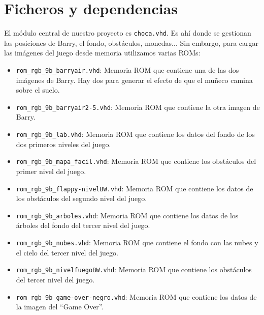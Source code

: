 \documentclass[11pt, a4paper, spanish, openright, twoside]{book}
\begin{document}
\newpage
\mbox{}
\thispagestyle{empty}						%
\newpage


\tableofcontents 							%

\newpage
\mbox{}
\thispagestyle{empty}						%
\newpage


\vspace{3cm}


\section{Ficheros y dependencias}
El módulo central de nuestro proyecto es \texttt{choca.vhd}. Es ahí donde se gestionan las posiciones de Barry, el fondo, obstáculos, monedas... Sin embargo, para cargar las imágenes del juego desde memoria utilizamos varias ROMs:

\begin{itemize}

	\item \texttt{rom\_rgb\_9b\_barryair.vhd}: Memoria ROM que contiene una de las dos imágenes de Barry.	Hay dos para generar el efecto de que el muñeco camina sobre el suelo.
	\item \texttt{rom\_rgb\_9b\_barryair2-5.vhd}: Memoria ROM que contiene la otra imagen de Barry.
	\item \texttt{rom\_rgb\_9b\_lab.vhd}: Memoria ROM que contiene los datos del fondo de los dos primeros niveles del juego.
	\item \texttt{rom\_rgb\_9b\_mapa\_facil.vhd}: Memoria ROM que contiene los obstáculos del primer nivel del juego.
	\item \texttt{rom\_rgb\_9b\_flappy-nivelBW.vhd}: Memoria ROM que contiene los datos de los obstáculos del segundo nivel del juego.
	\item \texttt{rom\_rgb\_9b\_arboles.vhd}: Memoria ROM que contiene los datos de los árboles del fondo del tercer nivel del juego.
	\item \texttt{rom\_rgb\_9b\_nubes.vhd}: Memoria ROM que contiene el fondo con las nubes y el cielo del tercer nivel del juego.
	\item \texttt{rom\_rgb\_9b\_nivelfuegoBW.vhd}: Memoria ROM que contiene los obstáculos del tercer nivel del juego.
	\item \texttt{rom\_rgb\_9b\_game-over-negro.vhd}: Memoria ROM que contiene los datos de la imagen del ``Game Over''.
	
\end{itemize}
\end{document}
